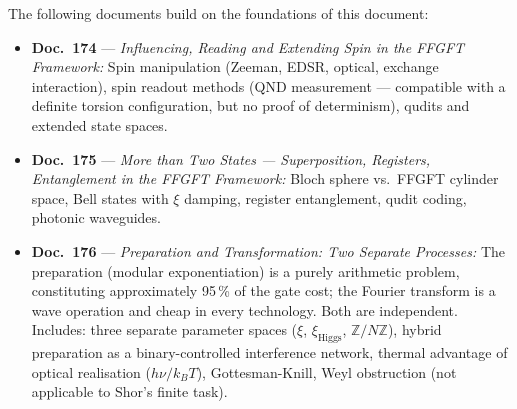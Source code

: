 The following documents build on the foundations of this document:

\begin{itemize}
  \item \textbf{Doc.~174} --- \textit{Influencing, Reading and Extending Spin
    in the FFGFT Framework:}
    Spin manipulation (Zeeman, EDSR, optical, exchange interaction),
    spin readout methods (QND measurement --- compatible with a definite
    torsion configuration, but no proof of determinism),
    qudits and extended state spaces.

  \item \textbf{Doc.~175} --- \textit{More than Two States --- Superposition,
    Registers, Entanglement in the FFGFT Framework:}
    Bloch sphere vs.\ FFGFT cylinder space, Bell states with $\xi$ damping,
    register entanglement, qudit coding, photonic waveguides.

  \item \textbf{Doc.~176} --- \textit{Preparation and Transformation: Two
    Separate Processes:}
    The preparation (modular exponentiation) is a purely arithmetic problem,
    constituting approximately 95\,\% of the gate cost; the Fourier transform
    is a wave operation and cheap in every technology. Both are independent.
    Includes: three separate parameter spaces ($\xi$, $\xi_{\text{Higgs}}$,
    $\mathbb{Z}/N\mathbb{Z}$), hybrid preparation as a binary-controlled
    interference network, thermal advantage of optical realisation
    ($h\nu/k_BT$), Gottesman-Knill, Weyl obstruction (not applicable to
    Shor's finite task).
\end{itemize}
